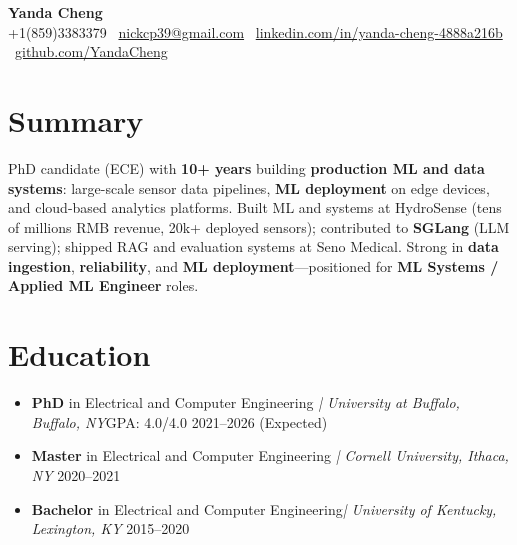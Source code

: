 \documentclass[letterpaper,10pt]{article}
\begin{document}
\begin{center}
  {\Large \textbf{Yanda Cheng}} \\
  \vspace{2pt}
  \small +1(859)3383379 \textbar\ \href{mailto:nickcp39@gmail.com}{nickcp39@gmail.com} \textbar\
\href{https://linkedin.com/in/yanda-cheng-4888a216b}{linkedin.com/in/yanda-cheng-4888a216b} \textbar\
\href{https://github.com/YandaCheng}{github.com/YandaCheng}

\end{center}
\vspace*{-10pt}
\vspace*{-5pt}

\section{Summary}
\small
PhD candidate (ECE) with \textbf{10+ years} building \textbf{production ML and data systems}: large-scale sensor data pipelines, \textbf{ML deployment} on edge devices, and cloud-based analytics platforms. Built ML and systems at HydroSense (tens of millions RMB revenue, 20k+ deployed sensors); contributed to \textbf{SGLang} (LLM serving); shipped RAG and evaluation systems at Seno Medical. Strong in \textbf{data ingestion}, \textbf{reliability}, and \textbf{ML deployment}—positioned for \textbf{ML Systems / Applied ML Engineer} roles.

\vspace*{-10pt}
\section{Education}
\begin{itemize}[leftmargin=0.0in, label={}, itemsep=2pt, topsep=2pt]
  \item \textbf{PhD}   in Electrical and Computer Engineering \hfill\textit{| University at Buffalo, Buffalo, NY}\hfill GPA: 4.0/4.0 \hfill 2021--2026 (Expected)
  \vspace*{-3pt}
  \item \textbf{Master}  in Electrical and Computer Engineering \hfill\textit{| Cornell University, Ithaca, NY} \hfill 2020--2021
  \vspace*{-3pt}
  \item \textbf{Bachelor}  in Electrical and Computer Engineering\hfill  \textit{| University of Kentucky, Lexington, KY} \hfill 2015--2020
\end{itemize}
\end{document}
